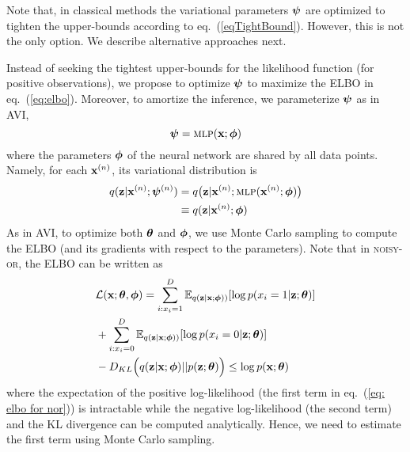 Note that, in classical methods the variational parameters $\bm{\psi}$ are optimized to tighten the upper-bounds according to eq.~(\ref{eqTightBound}).  However, this is not the only option. We describe alternative approaches next.




\fi

Instead of seeking the tightest upper-bounds for the likelihood function (for positive observations), we propose to optimize $\bm{\psi}$ to maximize the ELBO in eq.~(\ref{eq:elbo}). Moreover, to amortize the inference, we parameterize $\bm{\psi}$ as in AVI,
\begin{equation}
\bm{\psi} = \textsc{mlp}(\mathbf{x}; \bm{\phi})
\label{eq:mlp}
\end{equation}
where the parameters $\bm{\phi}$ of the neural network are shared by all data points. Namely, for each $\mathbf{x}^{(n)}$, its variational distribution is
\begin{align}
q(\mathbf{z}|\mathbf{x}^{(n)}; \bm{\psi}^{(n)}) & =  q\big(\mathbf{z}|\mathbf{x}^{(n)}; \textsc{mlp}(\mathbf{x}^{(n)}; \bm{\phi})\big)\nonumber \\
& \equiv q(\mathbf{z}|\mathbf{x}^{(n)}; \bm{\phi})
\end{align}
As in AVI, to optimize both $\bm{\theta}$ and $\bm{\phi}$, we use Monte Carlo sampling to compute the ELBO (and its gradients with respect to the parameters). Note that in \textsc{noisy-or}, the ELBO can be written as
\begin{align}
    & \mathcal{L(\mathbf{x}; \bm{\theta}, \bm{\phi})}  = \sum_{i:x_i=1}^D\mathbb{E}_{q(\mathbf{z}|\mathbf{x}; \bm{\phi}))}[\log p(x_i=1|\mathbf{z}; \bm{\theta})] \nonumber\\
    & + \sum_{i:x_i=0}^D \mathbb{E}_{q(\mathbf{z}|\mathbf{x}; \bm{\phi}))}[\log p(x_i=0|\mathbf{z}; \bm{\theta})] \nonumber\\
    & - D_{KL}\Big(q(\mathbf{z}|\mathbf{x}; \bm{\phi})||p(\mathbf{z}; \bm{\theta} )\Big) \leq \log p(\mathbf{x}; \bm{\theta})
\label{eq: elbo for nor}
\end{align}
where the expectation of the positive log-likelihood (the first term in eq.~(\ref{eq: elbo for nor})) is intractable while the negative log-likelihood (the second term) and the KL divergence can be computed analytically. Hence, we need to estimate the first term using Monte Carlo sampling. 

